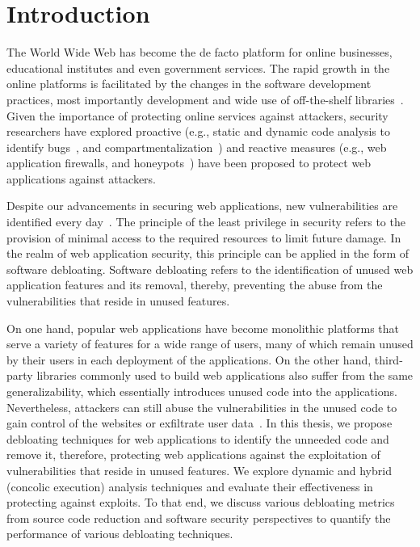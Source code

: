 \chapter{Introduction}

The World Wide Web has become the de facto platform for online businesses, educational institutes and even government services. 
The rapid growth in the online platforms is facilitated by the changes in the software development practices, most importantly development and wide use of off-the-shelf libraries~\cite{packagiststats, npmstatistics, pypi}. 
Given the importance of protecting online services against attackers, security researchers have explored proactive (e.g., static and dynamic code analysis to identify bugs~\cite{jovanovic2006pixy, dahse2010rips, alhuzali2018navex}, and 
compartmentalization~\cite{vasilakis2018breakapp}) and reactive measures (e.g., web application firewalls, and honeypots~\cite{makiou2014improving, barron2021click}) have been proposed to protect web applications against attackers. 

Despite our advancements in securing web applications, new vulnerabilities are identified every day~\cite{cvedetails}. 
The principle of the least privilege in security refers to the provision of minimal access to the required resources to limit future damage. 
In the realm of web application security, this principle can be applied in the form of software debloating. 
Software debloating refers to the identification of unused web application features and its removal, thereby, preventing the abuse from the vulnerabilities that reside in unused features. 

On one hand, popular web applications have become monolithic platforms that serve a variety of features for a wide range of users, many of which remain unused by their users in each deployment of the applications. 
On the other hand, third-party libraries commonly used to build web applications also suffer from the same generalizability, which essentially introduces unused code into the applications. 
Nevertheless, attackers can still abuse the vulnerabilities in the unused code to gain control of the websites or exfiltrate user data~\cite{drupalVulenrability, zendVulnerability, phpunitVulnerability, PHPGGC}. 
In this thesis, we propose debloating techniques for web applications to identify the unneeded code and remove it, therefore, protecting web applications against the exploitation of vulnerabilities that reside in unused features. 
We explore dynamic and hybrid (concolic execution) analysis techniques and evaluate their effectiveness in protecting against exploits. 
To that end, we discuss various debloating metrics from source code reduction and software security perspectives to quantify the performance of various debloating techniques. 



